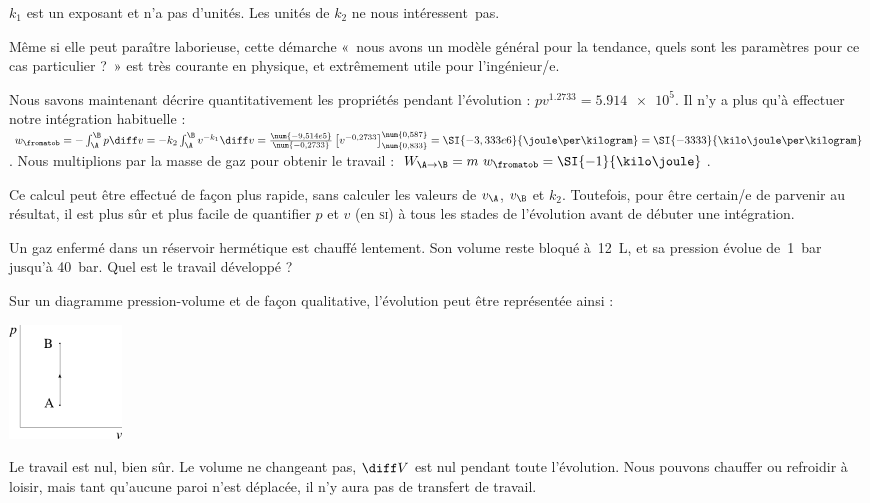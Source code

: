 \begin{anexample}
\begin{answer}
							\begin{remark}$k_1$ est un exposant et n’a pas d’unités. Les unités de $k_2$ ne nous intéressent~pas.\end{remark}
							\begin{remark}Même si elle peut paraître laborieuse, cette démarche «~nous avons un modèle général pour la tendance, quels sont les paramètres pour ce cas particulier ?~» est très courante en physique, et extrêmement utile pour l’ingénieur/e.\end{remark}
						Nous savons maintenant décrire quantitativement les propriétés pendant l’évolution : $p v^{\num{1,2733}} = \num{5,914e5}$.	Il n’y a plus qu’à effectuer notre intégration habituelle : $w_\fromatob = - \int_\A^\B p \diff v = - k_2 \int_\A^\B v^{-k_1} \diff v = \frac{\num{-9,514e5}}{\num{-0,2733}} \left[v^{-0,2733}\right]_{\num{0,833}}^{\num{0,587}} = \SI{-3,333e6}{\joule\per\kilogram} = \SI{-3333}{\kilo\joule\per\kilogram}$. Nous multiplions par la masse de gaz pour obtenir le travail : $W_{\A\to\B} = m \ w_\fromatob = \SI{-1}{\kilo\joule}$.
							\begin{remark}Ce calcul peut être effectué de façon plus rapide, sans calculer les valeurs de $v_\A$, $v_\B $ et $k_2$. Toutefois, pour être certain/e de parvenir au résultat, il est plus sûr et plus facile de quantifier $p$ et $v$ (en \textsc{si}) à tous les stades de l’évolution avant de débuter une intégration.\end{remark}
					\end{answer}
			\end{anexample}
			
			\begin{anexample}
				Un gaz enfermé dans un réservoir hermétique est chauffé lentement. Son volume reste bloqué à~\SI{12}{\liter}, et sa pression évolue de~\SI{1}{\bar} jusqu’à \SI{40}{\bar}. Quel est le travail développé ?
					\begin{answer}
						Sur un diagramme pression-volume et de façon qualitative, l’évolution peut être représentée ainsi :
							\begin{center}
								\includegraphics[width=3cm]{images/exe_pv_isochore.png}
							\end{center}
						Le travail est nul, bien sûr. Le volume ne changeant pas, $\diff V$ est nul pendant toute l’évolution. Nous pouvons chauffer ou refroidir à loisir, mais tant qu’aucune paroi n’est déplacée, il n’y aura pas de transfert de travail.
					\end{answer}
			\end{anexample}
			

